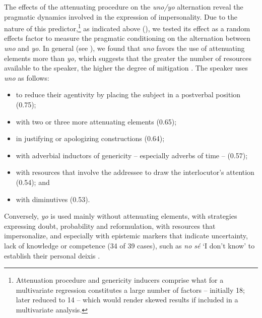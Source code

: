 \documentclass[output=paper]{langscibook}
\begin{document}
The effects of the attenuating procedure on the \textit{uno/yo} alternation reveal the pragmatic dynamics involved in the expression of impersonality. Due to the nature of this predictor,\footnote{Attenuation procedure and genericity inducers comprise what for a multivariate regression constitutes a large number of factors – initially 18; later reduced to 14 – which would render skewed results if included in a multivariate analysis.}  as indicated above (), we tested its effect as a random effects factor to measure the pragmatic conditioning on the alternation between \textit{uno} and \textit{yo}. In general (see ), we found that \textit{uno} favors the use of attenuating elements more than \textit{yo,} which suggests that the greater the number of resources available to the speaker, the higher the degree of mitigation \citep[368]{CesteroMancera2020}. The speaker uses \textit{uno} as follows:


\begin{itemize}
\item to reduce their agentivity by placing the subject in a postverbal position (0.75);  
\item with two or three more attenuating elements (0.65);
\item in justifying or apologizing constructions (0.64);
\item with adverbial inductors of genericity – especially adverbs of time – (0.57); 
\item with resources that involve the addressee to draw the interlocutor’s attention (0.54); and 
\item with diminutives (0.53). 
\end{itemize}

Conversely, \textit{yo} is used mainly without attenuating elements, with strategies expressing doubt, probability and reformulation, with resources that impersonalize, and especially with epistemic markers that indicate uncertainty, lack of knowledge or competence (34 of 39 cases), such as \textit{no sé} ‘I don’t know’ to establish their personal deixis \citep{Caffi2007}. 
\end{document}
